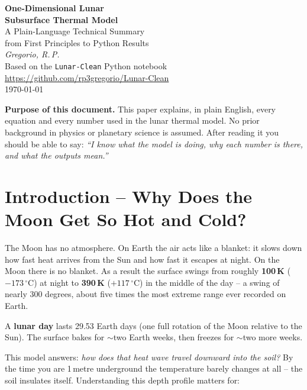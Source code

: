 \documentclass[12pt, a4paper]{article}
\begin{document}
\begin{titlepage}
  \centering\vspace*{1.8cm}
  {\Huge\bfseries\color{moonblue}
    One-Dimensional Lunar\\[6pt] Subsurface Thermal Model}\\[1.2cm]
  {\large A Plain-Language Technical Summary\\
   from First Principles to Python Results}\\[2.2cm]
  {\large\itshape Gregorio, R.\,P.}\\[0.5cm]
  {\normalsize\color{moongray}
   Based on the \texttt{Lunar-Clean} Python notebook\\[2pt]
   \url{https://github.com/rp3gregorio/Lunar-Clean}}\\[3cm]
  {\large \today}
  \vfill
  \begin{plainbox}
    \textbf{Purpose of this document.}
    This paper explains, in plain English, every equation and every
    number used in the lunar thermal model.
    No prior background in physics or planetary science is assumed.
    After reading it you should be able to say:
    \emph{``I know what the model is doing, why each number is there,
    and what the outputs mean.''}
  \end{plainbox}
\end{titlepage}

\tableofcontents
\newpage

\section{Introduction -- Why Does the Moon Get So Hot and Cold?}

The Moon has no atmosphere.
On Earth the air acts like a blanket: it slows down how fast heat
arrives from the Sun and how fast it escapes at night.
On the Moon there is no blanket.
As a result the surface swings from roughly
\textbf{100\,K} ($-173\,^{\circ}$C) at night to
\textbf{390\,K} ($+117\,^{\circ}$C) in the middle of the day --
a swing of nearly 300 degrees, about five times the most extreme
range ever recorded on Earth.

A \textbf{lunar day} lasts 29.53 Earth days (one full rotation of
the Moon relative to the Sun).
The surface bakes for $\sim$two Earth weeks, then freezes for
$\sim$two more weeks.

This model answers: \emph{how does that heat wave travel downward
into the soil?}
By the time you are 1\,metre underground the temperature barely
changes at all -- the soil insulates itself.
Understanding this depth profile matters for:
\end{document}
